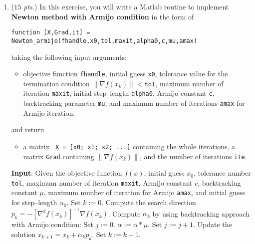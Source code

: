 \documentclass[a4paper,11pt]{article}
\begin{document}
\begin{enumerate}
\item (\textit{$15$ pts.}) In this exercise, you will write a Matlab routine to implement \textbf{Newton method with Armijo condition} in the form of
		\begin{center}
			\texttt{function [X,Grad,it] = \\ Newton\_armijo(fhandle,x0,tol,maxit,alpha0,c,mu,amax)}
		\end{center}
		taking the following input arguments:
		\begin{itemize}
			\item objective function \texttt{fhandle}, initial guess \texttt{x0}, tolerance value for the termination condition $ \lVert \nabla f(x_k)\rVert < \texttt{tol} $, maximum number of
            iteration \texttt{maxit}, initial step--length \texttt{alpha0}, Armijo constant \texttt{c}, backtracking parameter \texttt{mu}, and maximum number of iterations \texttt{amax} for Armijo  iteration.
		\end{itemize}
		and return
		\begin{itemize}
			\item a matrix \texttt{ X = [x0; x1; x2; ...]} containing the whole iterations, a matrix \texttt{Grad} containing  $ \lVert \nabla f(x_k)\rVert  $, and the number of iterations
            \texttt{ite}.
		\end{itemize}
        \begin{tcolorbox}[title={Newton Method with Armijo Condition}]
		\begin{algorithmic}[lines]
			\STATE \textbf{Input}: Given the objective function $f(x)$, initial guess $x_0$, tolerance number \texttt{tol}, maximum number of iteration \texttt{maxit}, Armijo constant $c$, backtracking constant $\mu$,  maximum number of iteration for Armijo \texttt{amax}, and initial guess for step--length $\alpha_0$.
			\STATE Set $k:=0$.
			\STATE Compute the search direction  $p_k = - \left[\nabla^2 f(x_k)\right]^{-1} \nabla f(x_k)$.
			\STATE Compute $\alpha_k$ by using backtracking approach with Armijo condition:
			\STATE Set $j:=0$.
			\STATE $\alpha := \alpha*\mu$.
			\STATE Set $j:=j+1$.
			\ENDWHILE
			\STATE Update the solution $x_{k+1} = x_k + \alpha_k p_k$.
			\STATE Set $k:=k+1$.
			\ENDWHILE
		\end{algorithmic}
        \end{tcolorbox}


\end{enumerate}
\end{document}
